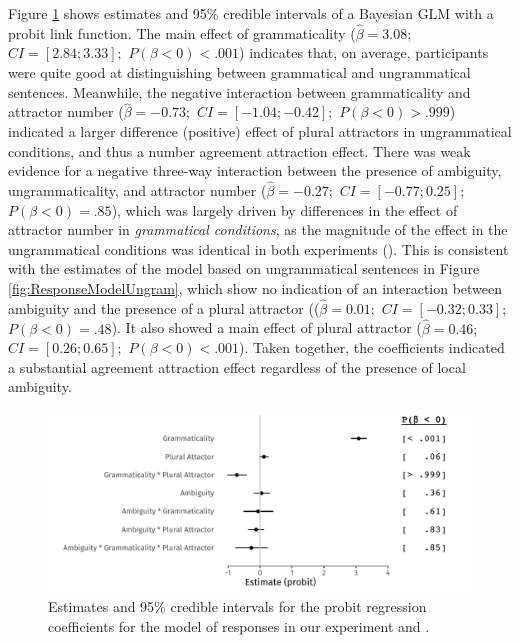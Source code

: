 \documentclass[apacite,linguex]{glossa}\usepackage[]{graphicx}\usepackage[]{color}
\makeatletter
\def\maxwidth{ %
  \ifdim\Gin@nat@width>\linewidth
    \linewidth
  \else
    \Gin@nat@width
  \fi
}
\newenvironment{knitrout}{}{} %
\makeatother
\begin{document}
Figure \ref{fig:ResponseModel} shows estimates and 95\% credible intervals of a Bayesian GLM with a probit link function. The main effect of grammaticality ($\hat{\beta}=3.08;$ $CI=[2.84; 3.33];$ $P(\beta<0)< .001$) indicates that, on average, participants were quite good at distinguishing between grammatical and ungrammatical sentences. Meanwhile, the negative interaction between grammaticality and attractor number ($\hat{\beta}=-0.73;$ $CI=[-1.04; -0.42];$ $P(\beta<0)> .999$) indicated a larger difference (positive) effect of plural attractors in ungrammatical conditions, and thus a number agreement attraction effect. There was weak evidence for a negative three-way interaction between the presence of ambiguity, ungrammaticality, and attractor number ($\hat{\beta}=-0.27;$ $CI=[-0.77; 0.25];$ $P(\beta<0)=    .85$), which was largely driven by differences in the effect of attractor number in \textit{grammatical conditions}, as the magnitude of the effect in the ungrammatical conditions was identical in both experiments ().  
This is consistent with the estimates of the model based on ungrammatical sentences in Figure \ref{fig:ResponseModelUngram}, which show no indication of an interaction between ambiguity and the presence of a plural attractor (($\hat{\beta}=0.01;$ $CI=[-0.32; 0.33];$ $P(\beta<0)=    .48$). It also showed a main effect of plural attractor ($\hat{\beta}=0.46;$ $CI=[0.26; 0.65];$ $P(\beta<0)< .001$). Taken together, the coefficients indicated a substantial agreement attraction effect regardless of the presence of local ambiguity.  



\begin{figure}[hbt!]
\centering


\begin{knitrout}
\color{fgcolor}

{\centering \includegraphics[width=\maxwidth]{figure/ResponseModel-1} 

}


\end{knitrout}

\caption{Estimates and 95\% credible intervals for the probit regression coefficients for the model of responses in our experiment and \citet{LagoEtAl:2019}.}
\label{fig:ResponseModel}
\end{figure}
\end{document}
